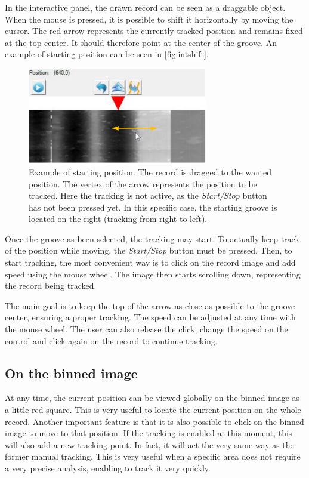 In the interactive panel, the drawn record can be seen as a draggable object. When the mouse is pressed, it is possible to shift it horizontally by moving the cursor. The red arrow represents the currently tracked position and remains fixed at the top-center. It should therefore point at the center of the groove. An example of starting position can be seen in \autoref{fig:intshift}.

\begin{figure}[!ht]
\centering
\includegraphics[width=0.7\textwidth]{images/int-mouse-shift}
\caption[Example of starting position.]
{Example of starting position. The record is dragged to the wanted position. The vertex of the arrow represents the position to be tracked. Here the tracking is not active, as the \emph{Start/Stop} button has not been pressed yet. In this specific case, the starting groove is located on the right (tracking from right to left).}
\label{fig:intshift}
\end{figure}

Once the groove as been selected, the tracking may start. To actually keep track of the position while moving, the \emph{Start/Stop} button must be pressed. Then, to start tracking, the most convenient way is to click on the record image and add speed using the mouse wheel. The image then starts scrolling down, representing the record being tracked.

The main goal is to keep the top of the arrow as close as possible to the groove center, ensuring a proper tracking. The speed can be adjusted at any time with the mouse wheel. The user can also release the click, change the speed on the control and click again on the record to continue tracking.

\subsection{On the binned image}

At any time, the current position can be viewed globally on the binned image as a little red square. This is very useful to locate the current position on the whole record. Another important feature is that it is also possible to click on the binned image to move to that position. If the tracking is enabled at this moment, this will also add a new tracking point. In fact, it will act the very same way as the former manual tracking. This is very useful when a specific area does not require a very precise analysis, enabling to track it very quickly.

